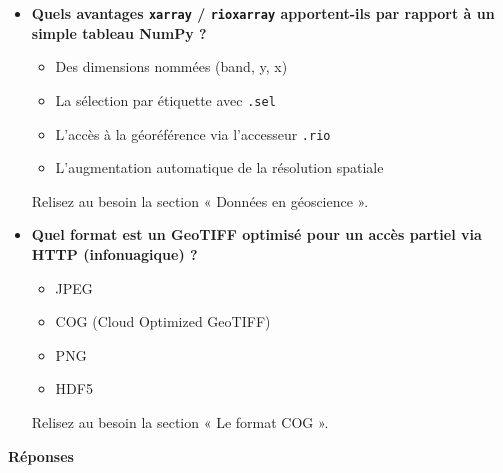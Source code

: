\documentclass[
  french,
  11pt,
  letterpaper,
  open=any,
  twoside=false,
  french]{scrbook}
\providecommand{\tightlist}{%
  \setlength{\itemsep}{0pt}\setlength{\parskip}{0pt}}
\begin{document}
\begin{itemize}
  Relisez au besoin la section « Découpage et indexation de la matrice »
  : les indices commencent à 0.
\item
  \textbf{Quels avantages \texttt{xarray} / \texttt{rioxarray}
  apportent-ils par rapport à un simple tableau NumPy ?}

  \begin{itemize}
  \tightlist
  \item
    Des dimensions nommées (band, y, x)
  \item
    La sélection par étiquette avec \texttt{.sel}
  \item
    L'accès à la géoréférence via l'accesseur \texttt{.rio}
  \item
    L'augmentation automatique de la résolution spatiale
  \end{itemize}

  Relisez au besoin la section « Données en géoscience ».
\item
  \textbf{Quel format est un GeoTIFF optimisé pour un accès partiel via
  HTTP (infonuagique) ?}

  \begin{itemize}
  \tightlist
  \item
    JPEG
  \item
    COG (Cloud Optimized GeoTIFF)
  \item
    PNG
  \item
    HDF5
  \end{itemize}

  Relisez au besoin la section « Le format COG ».
\end{itemize}

\textbf{Réponses}
\end{document}
